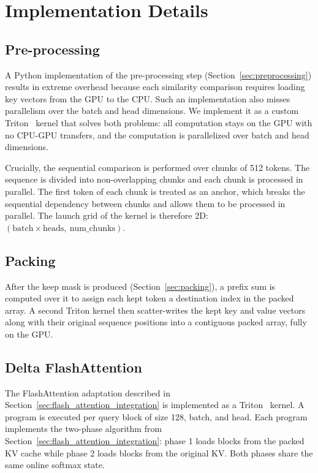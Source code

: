 \section{Implementation Details}

\subsection{Pre-processing}

A Python implementation of the pre-processing step (Section~\ref{sec:preprocessing}) results in extreme overhead because each similarity comparison requires loading key vectors from the GPU to the CPU. Such an implementation also misses parallelism over the batch and head dimensions. We implement it as a custom Triton~\cite{tillet2019triton} kernel that solves both problems: all computation stays on the GPU with no CPU-GPU transfers, and the computation is parallelized over batch and head dimensions.

Crucially, the sequential comparison is performed over chunks of 512 tokens. The sequence is divided into non-overlapping chunks and each chunk is processed in parallel. The first token of each chunk is treated as an anchor, which breaks the sequential dependency between chunks and allows them to be processed in parallel. The launch grid of the kernel is therefore 2D: $(\text{batch} \times \text{heads},\ \text{num\_chunks})$.

\subsection{Packing}

After the keep mask is produced (Section~\ref{sec:packing}), a prefix sum is computed over it to assign each kept token a destination index in the packed array. A second Triton kernel then scatter-writes the kept key and value vectors along with their original sequence positions into a contiguous packed array, fully on the GPU.

\subsection{Delta FlashAttention}

The FlashAttention adaptation described in Section~\ref{sec:flash_attention_integration} is implemented as a Triton~\cite{tillet2019triton} kernel. A program is executed per query block of size 128, batch, and head. Each program implements the two-phase algorithm from Section~\ref{sec:flash_attention_integration}: phase 1 loads blocks from the packed KV cache while phase 2 loads blocks from the original KV. Both phases share the same online softmax state.
